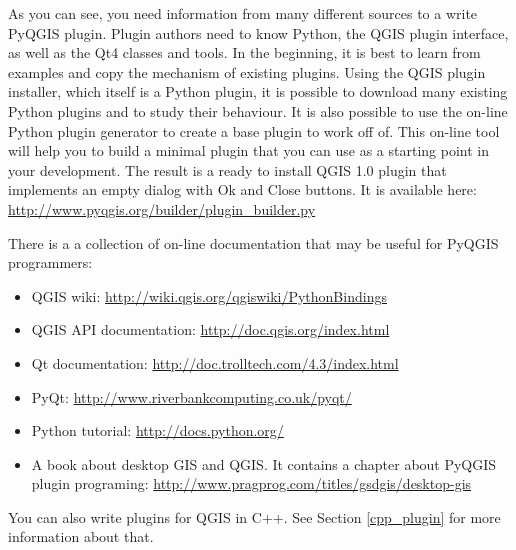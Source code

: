 As you can see, you need information from many different sources to a write PyQGIS
plugin. Plugin authors need to know Python, the QGIS plugin interface, as well 
as the Qt4 classes and tools. In the beginning, it is best to learn from
examples and copy the mechanism of existing plugins. Using the QGIS plugin
installer, which itself is a Python plugin, it is possible to download many 
existing Python plugins and to study their behaviour. It is also possible to use 
the on-line Python plugin generator to create a base plugin to work off of. This on-line 
tool will help you to build a minimal plugin that you can use as a starting point in your 
development. The result is a ready to install QGIS 1.0 plugin that implements an 
empty dialog with Ok and Close buttons. It is available here: \url{http://www.pyqgis.org/builder/plugin_builder.py}

There is a a collection of on-line documentation that may be useful for PyQGIS programmers:
 
\begin{itemize}
\item QGIS wiki: \url{http://wiki.qgis.org/qgiswiki/PythonBindings}
\item QGIS API documentation: \url{http://doc.qgis.org/index.html}
\item Qt documentation: \url{http://doc.trolltech.com/4.3/index.html}
\item PyQt: \url{http://www.riverbankcomputing.co.uk/pyqt/}
\item Python tutorial: \url{http://docs.python.org/}
\item A book about desktop GIS and QGIS. It contains a chapter about PyQGIS
plugin programing: \url{http://www.pragprog.com/titles/gsdgis/desktop-gis} 
\end{itemize}

You can also write plugins for QGIS in C++. See Section \ref{cpp_plugin} for
more information about that.


